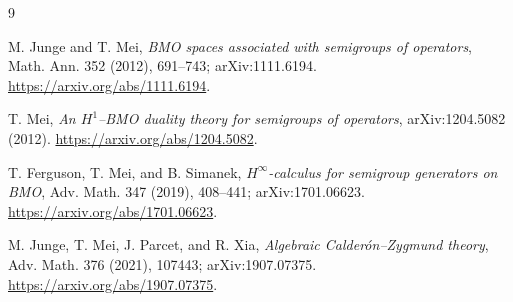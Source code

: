 \documentclass[11pt]{article}
\begin{document}
\sloppy
\begin{thebibliography}{9}
\raggedright
{}
M. Junge and T. Mei,
\emph{BMO spaces associated with semigroups of operators},
Math. Ann. 352 (2012), 691--743; arXiv:1111.6194.
\url{https://arxiv.org/abs/1111.6194}.

T. Mei,
\emph{An $H^1$--BMO duality theory for semigroups of operators},
arXiv:1204.5082 (2012).
\url{https://arxiv.org/abs/1204.5082}.

T. Ferguson, T. Mei, and B. Simanek,
\emph{$H^\infty$-calculus for semigroup generators on BMO},
Adv. Math. 347 (2019), 408--441; arXiv:1701.06623.
\url{https://arxiv.org/abs/1701.06623}.

M. Junge, T. Mei, J. Parcet, and R. Xia,
\emph{Algebraic Calderón--Zygmund theory},
Adv. Math. 376 (2021), 107443; arXiv:1907.07375.
\url{https://arxiv.org/abs/1907.07375}.
\end{thebibliography}
\end{document}
